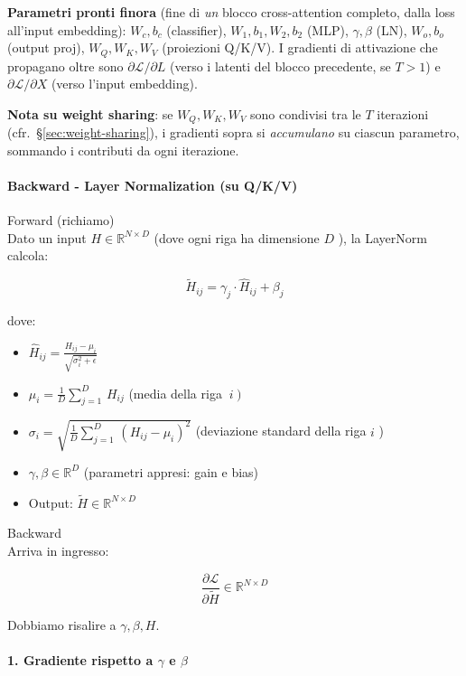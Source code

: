 \documentclass[
  11pt,
]{article}
\begin{document}
\begin{notabox}[title={\textbf{Checkpoint gradienti --- fine proiezioni lineari Q/K/V backward}}]
\medskip
\textbf{Parametri pronti finora} (fine di \emph{un} blocco cross-attention completo, dalla loss all'input embedding): $W_c, b_c$ (classifier), $W_1, b_1, W_2, b_2$ (MLP), $\gamma, \beta$ (LN), $W_o, b_o$ (output proj), $W_Q, W_K, W_V$ (proiezioni Q/K/V). I gradienti di attivazione che propagano oltre sono $\partial\mathcal{L}/\partial L$ (verso i latenti del blocco precedente, se $T > 1$) e $\partial\mathcal{L}/\partial X$ (verso l'input embedding).

\medskip
\textbf{Nota su weight sharing}: se $W_Q, W_K, W_V$ sono condivisi tra le $T$ iterazioni (cfr.\ \S\ref{sec:weight-sharing}), i gradienti sopra si \emph{accumulano} su ciascun parametro, sommando i contributi da ogni iterazione.
\end{notabox}

\paragraph{Backward - Layer Normalization (su Q/K/V)}
Forward (richiamo)\\
Dato un input \(H \in \mathbb{R}^{N \times D}\) (dove ogni riga ha
dimensione \(D\) ), la LayerNorm calcola:

\[{\widetilde{H}}_{ij} = \gamma_{j} \cdot {\widehat{H}}_{ij} + \beta_{j}\]

dove:

\begin{itemize}
\item
  \({\widehat{H}}_{ij} = \frac{H_{ij} - \mu_{i}}{\sqrt{\sigma_{i}^{2} + \epsilon}}\)
\item
  \(\mu_{i} = \frac{1}{D}\sum_{j = 1}^{D}\, H_{ij}\) (media
  della riga \(\left. \ i \right)\)
\item
  \(\sigma_{i} = \sqrt{\frac{1}{D}\sum_{j = 1}^{D}\,\left( H_{ij} - \mu_{i} \right)^{2}}\)
  (deviazione standard della riga \(i\) )
\item
  \(\gamma,\beta \in \mathbb{R}^{D}\) (parametri appresi: gain e bias)
\item
  Output: \(\widetilde{H} \in \mathbb{R}^{N \times D}\)
\end{itemize}

Backward\\
Arriva in ingresso:

\[\frac{\partial\mathcal{L}}{\partial\widetilde{H}} \in \mathbb{R}^{N \times D}\]

Dobbiamo risalire a \(\gamma,\beta,H\).

\paragraph{1. Gradiente rispetto a $\gamma$ e $\beta$}
\end{document}

